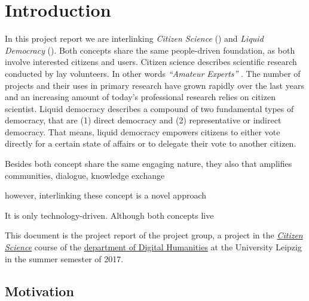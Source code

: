 \chapter{Introduction}
\label{ch:Introduction}


In this project report we are interlinking \textit{Citizen Science} () and \textit{Liquid Democracy} (). Both concepts share the same people-driven foundation, as both involve interested citizens and users. Citizen science describes scientific research conducted by lay volunteers. In other words \textit{“Amateur Experts”}  \parencite{Gura2013}. The number of  projects and their uses in primary research have grown rapidly over the last years \parencite{Kosmala2016} and an increasing amount of today’s professional research relies on citizen scientist. Liquid democracy describes a compound of two fundamental types of democracy, that are (1) direct democracy and (2) representative or indirect democracy. That means, liquid democracy empowers citizens to either vote directly for a certain state of affairs or to  delegate their vote to another citizen.

Besides both concept share the same engaging nature, they also that amplifies communities, dialogue, knowledge exchange

however, interlinking these concept is a novel approach

It is only technology-driven. Although both concepts live 


This document is the project report of the  project group, a project in the \href{http://www.dh.uni-leipzig.de/wo/courses/summer-semester-20142015/citizen-science/}{\textit{Citizen Science}} course of the \href{http://www.dh.uni-leipzig.de/wo/}{department of Digital Humanities} at the University Leipzig in the summer semester of 2017.

\section{Motivation}
\label{sec:Motivation}

